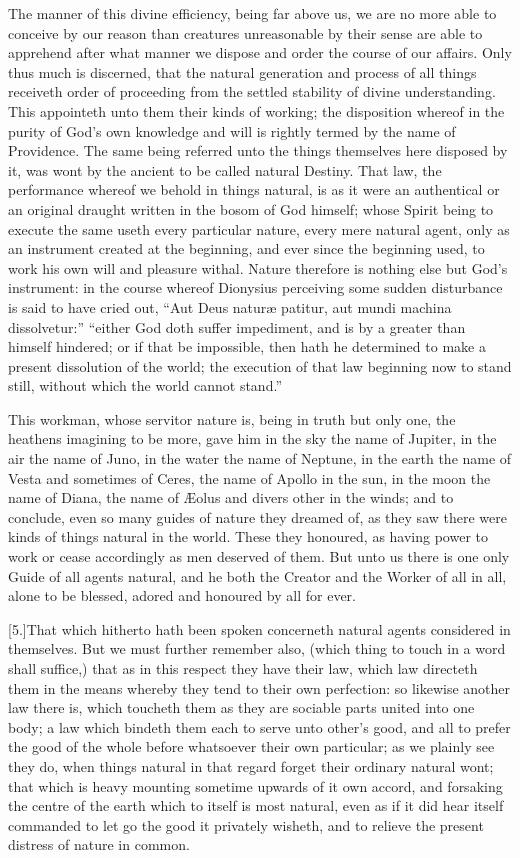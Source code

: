The manner of this divine efficiency, being far above us, we are no more able to conceive by our reason than creatures unreasonable by their sense are able to apprehend after what manner we dispose and order the course of our affairs. Only thus much is discerned, that the natural generation and process of all things receiveth order of proceeding from the settled stability of divine understanding. This appointeth unto them their kinds of working; the disposition whereof in the purity of God’s own knowledge and will is rightly termed by the name of Providence. The same being referred unto the things themselves here disposed by it, was wont by the ancient to be called natural Destiny. That law, the performance whereof we behold in things natural, is as it were an authentical or an original draught written in the bosom of God himself; whose Spirit being to execute the same useth every particular nature, every mere natural agent, only as an instrument created at the beginning, and ever since the beginning used, to work his own will and pleasure withal. Nature therefore is nothing else but God’s instrument: in the course whereof Dionysius perceiving  some sudden disturbance is said to have cried out, “Aut Deus naturæ patitur, aut mundi machina dissolvetur:” “either God doth suffer impediment, and is by a greater than himself hindered; or if that be impossible, then hath he determined to make a present dissolution of the world; the execution of that law beginning now to stand still, without which the world cannot stand.”

This workman, whose servitor nature is, being in truth but only one, the
heathens imagining to be more, gave him in the sky the name of Jupiter, in the air the name of Juno, in the water the name of Neptune, in the earth the name of Vesta and sometimes of Ceres, the name of Apollo in the sun, in the moon the name of Diana, the name of Æolus and divers other in the winds; and to conclude, even so many guides of nature they dreamed of, as they saw there were kinds of things natural in the world. These they honoured, as having power to work or cease accordingly as men deserved of them. But unto us there is one only Guide of all agents natural, and he both the Creator and the Worker of all in all, alone to be blessed, adored and honoured by all for ever.

[5.]That which hitherto hath been spoken concerneth natural agents considered in themselves. But we must further remember also, (which thing to touch in a word shall suffice,) that as in this respect they have their law, which law directeth them in the means whereby they tend to their own perfection: so likewise another law there is, which toucheth them as they are sociable parts united into one body; a law which bindeth them each to serve unto other’s good, and all to prefer the good of the whole before whatsoever their own particular; as we plainly see they do, when things natural in that regard forget their ordinary natural wont; that which is heavy mounting sometime upwards of  it own accord, and forsaking the centre of the earth which to itself is most natural, even as if it did hear itself commanded to let go the good it privately wisheth, and to relieve the present distress of nature in common.


